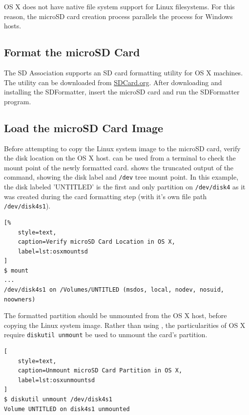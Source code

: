 OS X does not have native file system support for Linux filesystems. For this reason, the microSD card creation process parallels the process for Windows hosts. 


\subsection{Format the microSD Card}

The SD Association supports an SD card formatting utility for OS X machines. The utility can be downloaded from \href{https://www.sdcard.org/downloads/formatter_4}{SDCard.org}. After downloading and installing the SDFormatter, insert the microSD card and run the SDFormatter program. 





\subsection{Load the microSD Card Image}

Before attempting to copy the Linux system image to the microSD card, verify the disk location on the OS X host.  can be used from a terminal to check the mount point of the newly formatted card.  shows the truncated output of the  command, showing the disk label and \texttt{/dev} tree mount point. In this example, the disk labeled 'UNTITLED' is the first and only partition on \texttt{/dev/disk4} as it was created during the card formatting step (with it's own file path \texttt{/dev/disk4s1}). 


\begin{lstlisting}[%
	style=text,
	caption=Verify microSD Card Location in OS X,
	label=lst:osxmountsd
]
$ mount
...
/dev/disk4s1 on /Volumes/UNTITLED (msdos, local, nodev, nosuid, noowners)
\end{lstlisting}


The formatted partition should be unmounted from the OS X host, before copying the Linux system image. Rather than using , the particularities of OS X require \texttt{diskutil unmount} be used to unmount the card's partition. 


\begin{lstlisting}[
	style=text,
	caption=Unmount microSD Card Partition in OS X,
	label=lst:osxunmountsd
]
$ diskutil unmount /dev/disk4s1
Volume UNTITLED on disk4s1 unmounted
\end{lstlisting}



